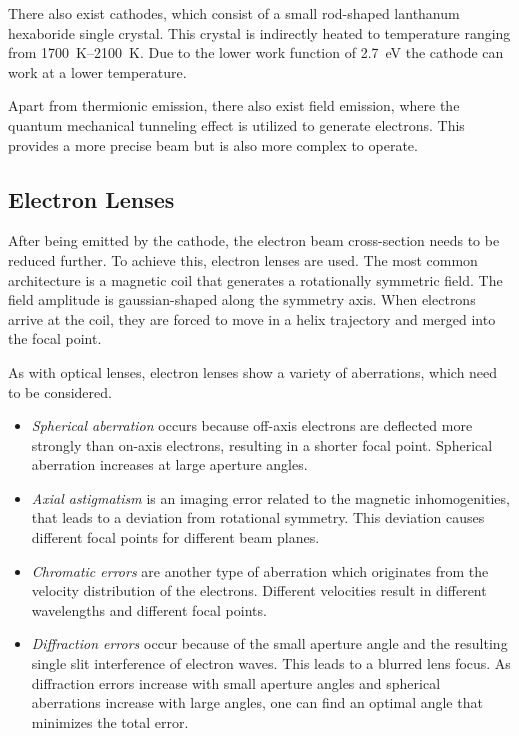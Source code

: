 There also exist  cathodes, which consist of a small rod-shaped
lanthanum hexaboride single crystal.
This crystal is indirectly heated to temperature ranging
from \qtyrange{1700}{2100}{\kelvin}.
Due to the lower work function of \qty{2.7}{\electronvolt} the cathode
can work at a lower temperature.

Apart from thermionic emission, there also exist field emission, where
the quantum mechanical tunneling effect is utilized to generate electrons.
This provides a more precise beam but is also more complex to operate.

\subsection{Electron Lenses}
After being emitted by the cathode, the electron beam cross-section
needs to be reduced further.
To achieve this, electron lenses are used.
The most common architecture is a magnetic coil that generates a
rotationally symmetric field.
The field amplitude is gaussian-shaped along the symmetry axis.
When electrons arrive at the coil, they are forced to move in a helix
trajectory and merged into the focal point.

As with optical lenses, electron lenses show a variety of
aberrations, which need to be considered.
\begin{itemize}
	\item \textit{Spherical aberration} occurs because off-axis electrons
	      are deflected more strongly than on-axis electrons, resulting in a
	      shorter focal point. Spherical aberration increases at large
	      aperture angles.
	\item \textit{Axial astigmatism} is an imaging error related to the
	      magnetic inhomogenities, that leads to a deviation from rotational
	      symmetry.
	      This deviation causes different focal points for different beam
	      planes.
	\item \textit{Chromatic errors} are another type of aberration
	      which originates from the velocity distribution of the electrons.
	      Different velocities result in different wavelengths and different
	      focal points.
	\item \textit{Diffraction errors} occur because of the small aperture
	      angle and the resulting single slit interference of electron waves.
	      This leads to a blurred lens focus.
	      As diffraction errors increase with small aperture angles and
	      spherical aberrations increase with large angles, one can find an
	      optimal angle that minimizes the total error.
\end{itemize}
